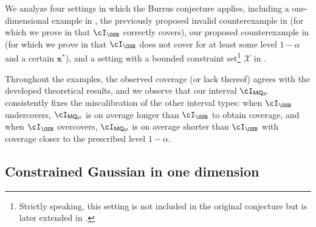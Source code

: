 \documentclass[11pt]{article}
\numberwithin{equation}{section}
\numberwithin{figure}{section}
\begin{document}
We analyze four settings in which the Burrus conjecture applies, including a one-dimensional example in , the previously proposed invalid counterexample in  (for which we prove in  that $\cI_{\OSB}$ correctly covers), our proposed counterexample in   (for which we prove in  that $\cI_{\OSB}$ does not cover for at least some level $1-\alpha$ and a certain $\bm{x}^*$), and a setting with a bounded constraint set\footnote{Strictly speaking, this setting is not included in the original \rustburrus conjecture but is later extended in \cite{patil,stanley_unfolding}.} $\mathcal X$ in .

Throughout the examples, the observed coverage (or lack thereof) agrees with the developed theoretical results, and we observe that our interval $\cI_{\mathsf{MQ\mu}}$ consistently fixes the miscalibration of the other interval types: when $\cI_{\OSB}$ undercovers, $\cI_{\mathsf{MQ\mu}}$ is on average longer than $\cI_{\OSB}$ to obtain coverage, and when $\cI_{\OSB}$ overcovers, $\cI_{\mathsf{MQ\mu}}$ is on average shorter than $\cI_{\OSB}$ with coverage closer to the prescribed level $1-\alpha$. 

\subsection{Constrained Gaussian in one dimension} 
\label{subsec:1d_numerics}
\end{document}

